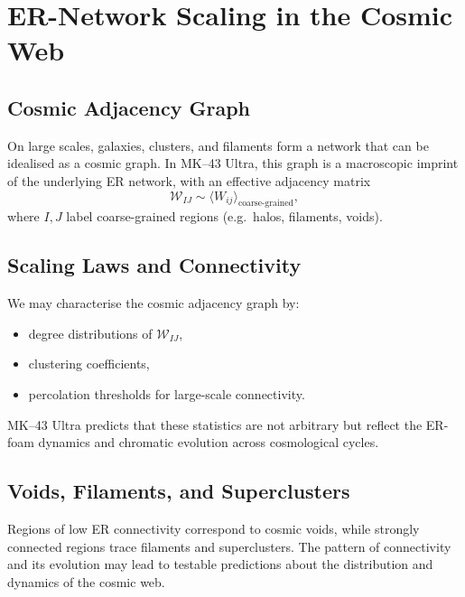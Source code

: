 \chapter{ER-Network Scaling in the Cosmic Web}

\section{Cosmic Adjacency Graph}

On large scales, galaxies, clusters, and filaments form a network that can be idealised as a cosmic graph.
In MK--43 Ultra, this graph is a macroscopic imprint of the underlying ER network, with an effective adjacency matrix
\[
  \mathcal{W}_{IJ} \sim \langle W_{ij} \rangle_{\text{coarse-grained}},
\]
where $I,J$ label coarse-grained regions (e.g.\ halos, filaments, voids).

\section{Scaling Laws and Connectivity}

We may characterise the cosmic adjacency graph by:
\begin{itemize}
  \item degree distributions of $\mathcal{W}_{IJ}$,
  \item clustering coefficients,
  \item percolation thresholds for large-scale connectivity.
\end{itemize}
MK--43 Ultra predicts that these statistics are not arbitrary but reflect the ER-foam dynamics and chromatic evolution across cosmological cycles.

\section{Voids, Filaments, and Superclusters}

Regions of low ER connectivity correspond to cosmic voids, while strongly connected regions trace filaments and superclusters.
The pattern of connectivity and its evolution may lead to testable predictions about the distribution and dynamics of the cosmic web.

